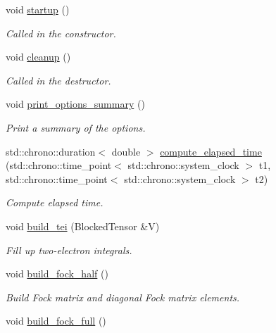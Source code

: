 \begin{DoxyCompactItemize}
\item 
void \mbox{\hyperlink{classforte_1_1_d_s_r_g___m_r_p_t3_ae03d4e96612c876c0d9f0715f93316fe}{startup}} ()
\begin{DoxyCompactList}\small\item\em Called in the constructor. \end{DoxyCompactList}\item 
void \mbox{\hyperlink{classforte_1_1_d_s_r_g___m_r_p_t3_ac7f2deb2afe35fcbe80b0f7863cb79d1}{cleanup}} ()
\begin{DoxyCompactList}\small\item\em Called in the destructor. \end{DoxyCompactList}\item 
void \mbox{\hyperlink{classforte_1_1_d_s_r_g___m_r_p_t3_a73debd7fa355ac2311d92f6d86b5e3e5}{print\+\_\+options\+\_\+summary}} ()
\begin{DoxyCompactList}\small\item\em Print a summary of the options. \end{DoxyCompactList}\item 
std\+::chrono\+::duration$<$ double $>$ \mbox{\hyperlink{classforte_1_1_d_s_r_g___m_r_p_t3_ac2e41cad2c6f82f0b7051b02becd1595}{compute\+\_\+elapsed\+\_\+time}} (std\+::chrono\+::time\+\_\+point$<$ std\+::chrono\+::system\+\_\+clock $>$ t1, std\+::chrono\+::time\+\_\+point$<$ std\+::chrono\+::system\+\_\+clock $>$ t2)
\begin{DoxyCompactList}\small\item\em Compute elapsed time. \end{DoxyCompactList}\item 
void \mbox{\hyperlink{classforte_1_1_d_s_r_g___m_r_p_t3_ac610cb51af174c9c3fd3eb2d68f62bb3}{build\+\_\+tei}} (Blocked\+Tensor \&V)
\begin{DoxyCompactList}\small\item\em Fill up two-\/electron integrals. \end{DoxyCompactList}\item 
void \mbox{\hyperlink{classforte_1_1_d_s_r_g___m_r_p_t3_aed32292cef9e15981542c638236748b8}{build\+\_\+fock\+\_\+half}} ()
\begin{DoxyCompactList}\small\item\em Build Fock matrix and diagonal Fock matrix elements. \end{DoxyCompactList}\item 
void \mbox{\hyperlink{classforte_1_1_d_s_r_g___m_r_p_t3_acf82777d9515f7cc988b82c03ffeb291}{build\+\_\+fock\+\_\+full}} ()

\end{DoxyCompactItemize}
